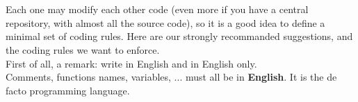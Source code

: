 \section*{}

Each one may modify each other code (even more if you have a central
repository, with almost all the source code), so it is a good idea to
define a minimal set of coding rules. Here are our strongly
recommanded suggestions, and the coding rules we want to enforce.\\

First of all, a remark: write in English and in English only.\\
Comments, functions names, variables, ... must all be in {\bf
  English}. It is the de facto programming language.
